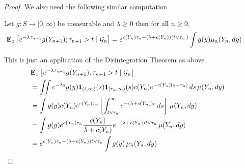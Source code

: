 \begin{proof}
We also need the following similar computation
\begin{clm}\label{PureJumpTypeConstruction:Computation2}Let $g : S \to [0,\infty)$ be measurable and $\lambda \geq 0$ then for all $n \geq 0$,
\begin{align*}
\csexpectationlong{\mathcal{G}_n}{ e^{-\lambda \tau_{n+1}} g(Y_{n+1}) ; \tau_{n+1} > t }{x} &= e^{c(Y_n) \tau_n - (\lambda + c(Y_n))(t \maxop \tau_m)} \int g(y) \mu_\alpha(Y_n, dy)
\end{align*}
\end{clm}
This is just an application of the Disintegration Theorem as above
\begin{align*}
&\csexpectationlong{\mathcal{G}_n}{ e^{-\lambda \tau_{n+1}} g(Y_{n+1}) ; \tau_{n+1} > t }{x} \\
&=\iint e^{-\lambda s} g(y) \characteristic{(t,\infty)}(s) \characteristic{[\tau_n, \infty)}(s) c(Y_n) e^{-c(Y_n)(s - \tau_n)} \, ds \, \mu(Y_n, dy) \\
&=\int g(y)  c(Y_n)  e^{c(Y_n) \tau_n} \left [ \int_{t \maxop \tau_n}^\infty  e^{-(\lambda +c(Y_n)) s} \, ds \right ] \, \mu(Y_n, dy) \\
&=\int g(y)  e^{c(Y_n) \tau_n} \frac{c(Y_n)}{\lambda +c(Y_n)} e^{-(\lambda +c(Y_n)) t \maxop \tau_n}  \, \mu(Y_n, dy) \\
&= e^{c(Y_n) \tau_n-(\lambda +c(Y_n)) t \maxop \tau_n}  \int g(y) \, \mu_\lambda(Y_n, dy) \\
\end{align*}


\end{proof}
